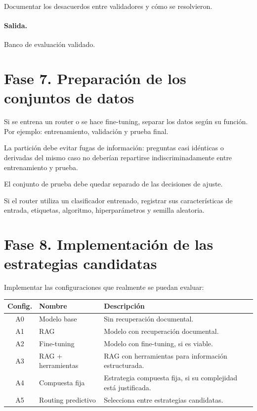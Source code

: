 \documentclass[11pt,a4paper]{article}
\begin{document}
Documentar los desacuerdos entre validadores y cómo se resolvieron.

\paragraph{Salida.}
Banco de evaluación validado.

\section{Fase 7. Preparación de los conjuntos de datos}

Si se entrena un router o se hace fine-tuning, separar los datos según su función. Por ejemplo: entrenamiento, validación y prueba final.

La partición debe evitar fugas de información: preguntas casi idénticas o derivadas del mismo caso no deberían repartirse indiscriminadamente entre entrenamiento y prueba.

El conjunto de prueba debe quedar separado de las decisiones de ajuste.

Si el router utiliza un clasificador entrenado, registrar sus características de entrada, etiquetas, algoritmo, hiperparámetros y semilla aleatoria.

\section{Fase 8. Implementación de las estrategias candidatas}

Implementar las configuraciones que realmente se puedan evaluar:

\begin{center}
\begin{tabular}{@{}clp{}@{}}
\toprule
\textbf{Config.} & \textbf{Nombre} & \textbf{Descripción} \\
\midrule
A0 & Modelo base & Sin recuperación documental. \\
A1 & RAG & Modelo con recuperación documental. \\
A2 & Fine-tuning & Modelo con fine-tuning, si es viable. \\
A3 & RAG + herramientas & RAG con herramientas para información estructurada. \\
A4 & Compuesta fija & Estrategia compuesta fija, si su complejidad está justificada. \\
A5 & Routing predictivo & Selecciona entre estrategias candidatas. \\
\bottomrule
\end{tabular}
\end{center}
\end{document}
